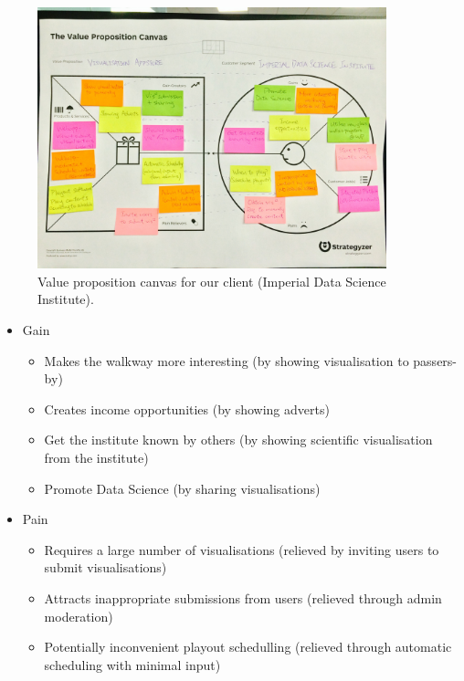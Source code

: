 \documentclass[a4paper, titlepage]{article}
\begin{document}
\begin{figure}[ht]
   \begin{center}
      \includegraphics[width = 0.9\textwidth, trim = 1cm 6.5cm 1cm 4.5cm, clip]{./eval/value_prop_canvas.jpg}
   \end{center}
   \caption{Value proposition canvas for our client (Imperial Data Science Institute).}
   \label{fig:eval_valpropcanvas}
\end{figure}

\begin{itemize}

\item Gain
   \begin{itemize}
      \itemsep-2mm
      \item Makes the walkway more interesting (by showing visualisation to passers-by)
      \item Creates income opportunities (by showing adverts)
      \item Get the institute known by others (by showing scientific visualisation from the institute)
      \item Promote Data Science (by sharing visualisations)
   \end{itemize}

\item Pain
   \begin{itemize}
      \itemsep-2mm
      \item Requires a large number of visualisations (relieved by inviting users to submit visualisations)
      \item Attracts inappropriate submissions from users (relieved through admin moderation)
      \item Potentially inconvenient playout schedulling (relieved through automatic scheduling with minimal input)
   \end{itemize}
\end{itemize} 
\end{document}
